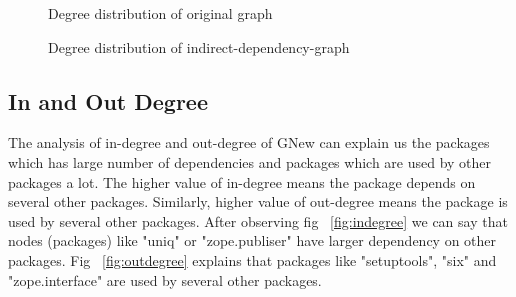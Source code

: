 \begin{figure}[htbp]
\centering
{}
\caption{Degree distribution of original graph}
\label{fig:gdegree}
\end{figure}

\begin{figure}[htbp]
\centering
{}
\caption{Degree distribution of indirect-dependency-graph}
\label{fig:gnewdegree}
\end{figure}


\subsection{In and Out Degree} \label{inoutdegree}
The analysis of in-degree and out-degree of GNew can explain us the packages
which has large number of dependencies and packages which are used by other
packages a lot.
The higher value of in-degree means the package depends on several other
packages. Similarly, higher value of out-degree means the package is used by
several other packages.
After observing fig ~\ref{fig:indegree} we can say that nodes (packages) like
 "uniq" or "zope.publiser" have larger dependency on other packages.
Fig ~\ref{fig:outdegree} explains that packages like "setuptools", "six" and
 "zope.interface" are used by several other packages.

